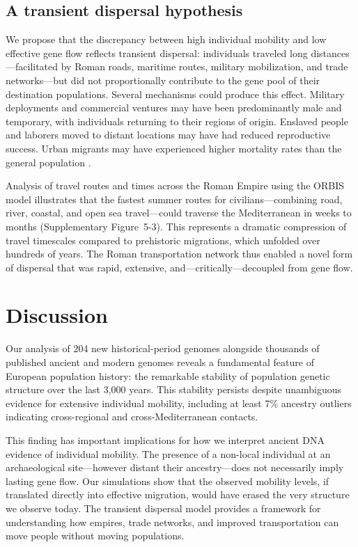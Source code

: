 \documentclass[11pt]{article}
\begin{document}
\subsection{A transient dispersal hypothesis}

We propose that the discrepancy between high individual mobility and low effective gene flow reflects transient dispersal: individuals traveled long distances---facilitated by Roman roads, maritime routes, military mobilization, and trade networks---but did not proportionally contribute to the gene pool of their destination populations. Several mechanisms could produce this effect. Military deployments and commercial ventures may have been predominantly male and temporary, with individuals returning to their regions of origin. Enslaved people and laborers moved to distant locations may have had reduced reproductive success. Urban migrants may have experienced higher mortality rates than the general population \citep{scheidel2001death}.

Analysis of travel routes and times across the Roman Empire using the ORBIS model \citep{scheidel2014orbis} illustrates that the fastest summer routes for civilians---combining road, river, coastal, and open sea travel---could traverse the Mediterranean in weeks to months (Supplementary Figure~5-3). This represents a dramatic compression of travel timescales compared to prehistoric migrations, which unfolded over hundreds of years. The Roman transportation network thus enabled a novel form of dispersal that was rapid, extensive, and---critically---decoupled from gene flow.

\section{Discussion}

Our analysis of 204 new historical-period genomes alongside thousands of published ancient and modern genomes reveals a fundamental feature of European population history: the remarkable stability of population genetic structure over the last 3,000 years. This stability persists despite unambiguous evidence for extensive individual mobility, including at least 7\% ancestry outliers indicating cross-regional and cross-Mediterranean contacts.

This finding has important implications for how we interpret ancient DNA evidence of individual mobility. The presence of a non-local individual at an archaeological site---however distant their ancestry---does not necessarily imply lasting gene flow. Our simulations show that the observed mobility levels, if translated directly into effective migration, would have erased the very structure we observe today. The transient dispersal model provides a framework for understanding how empires, trade networks, and improved transportation can move people without moving populations.
\end{document}
